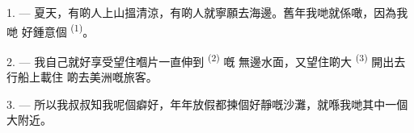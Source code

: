%
%
%
%
%
%
%

\VUsaut{4.0mm}
\VUsaut{3.0mm}
\VUsaut{3.0mm}

1. --- 夏天，有啲人上山搵清涼，有啲人就寧願去海邊。舊年我哋就係噉，因為我哋
好鍾意個 \textsuperscript{(1)}。

2. --- 我自己就好享受望住嗰片一直伸到 \textsuperscript{(2)} 嘅
無邊水面，又望住啲大 \textsuperscript{(3)} 開出去行船上載住
啲去美洲嘅旅客。

3. --- 所以我叔叔知我呢個癖好，年年放假都揀個好靜嘅沙灘，就喺我哋其中一個
大附近。

